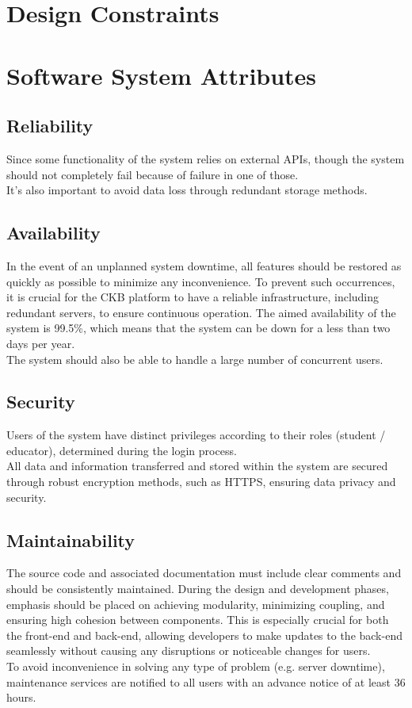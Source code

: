 {\color{red}\section{Design Constraints}}

\section{Software System Attributes}
\subsection{Reliability}
Since some functionality of the system relies on external APIs, though the system should not completely fail because of failure in one of those.\\
It's also important to avoid data loss through redundant storage methods.

\subsection{Availability}
In the event of an unplanned system downtime, all features should be restored as quickly as possible to minimize any inconvenience. To prevent such occurrences, it is crucial for the CKB platform to have a reliable infrastructure, including redundant servers, to ensure continuous operation.
The aimed availability of the system is 99.5\%, which means that the system can be down for a less than two days per year.\\
The system should also be able to handle a large number of concurrent users.

\subsection{Security}
Users of the system have distinct privileges according to their roles (student / educator), determined during the login process.\\
All data and information transferred and stored within the system are secured through robust encryption methods, such as HTTPS, ensuring data privacy and security.\\

\subsection{Maintainability}
The source code and associated documentation must include clear comments and should be consistently maintained. During the design and development phases, emphasis should be placed on achieving modularity, minimizing coupling, and ensuring high cohesion between components.
This is especially crucial for both the front-end and back-end, allowing developers to make updates to the back-end seamlessly without causing any disruptions or noticeable changes for users.\\
To avoid inconvenience in solving any type of problem (e.g. server downtime), maintenance services are notified to all users with an advance notice of at least 36 hours.

